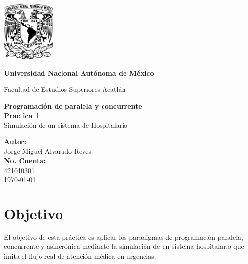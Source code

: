 \documentclass{article}
\begin{document}
\begin{titlepage}
    \begin{center}
        \includegraphics[width=0.2\textwidth]{unam.png}
        \vspace*{.5cm}

        \LARGE
        \textbf{Universidad Nacional Aut\'onoma de M\'exico}

        \vspace{0.5cm}
        \LARGE
        Facultad de Estudios Superiores Acatl\'an


        \vspace{2cm}

        \textbf{Programaci\'on de paralela y concurrente} \\
        \vspace{0.5cm}
        \textbf{Practica 1} \\
        Simulaci\'on de un sistema de Hospitalario \\


        \vfill

        \vspace{1cm}

        \textbf{\large Autor:} \\
        Jorge Miguel Alvarado Reyes \\
        \textbf{\large No. Cuenta:} \\
        421010301\\
        \vspace{.5cm}
        \normalsize \today

    \end{center}
\end{titlepage}

\tableofcontents

\newpage

\section*{Objetivo}
El objetivo de esta práctica es aplicar los paradigmas de programación paralela, concurrente y asincrónica mediante la simulación de un sistema hospitalario que imita el flujo real de atención médica en urgencias.
\end{document}
